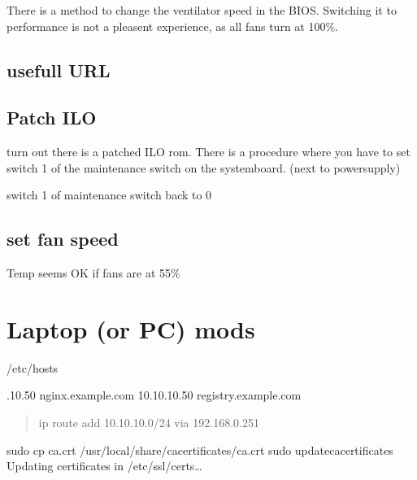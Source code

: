 \documentclass[letterpaper,10pt,english]{sphinxmanual}
\begin{document}
\sphinxAtStartPar
There is a method to change the ventilator speed in the BIOS. Switching it to performance is not a pleasent experience, as all fans turn at 100\%.


\section{usefull URL}
\label{\detokenize{fan:usefull-url}}
\sphinxAtStartPar
{}

\sphinxAtStartPar
{}


\section{Patch ILO}
\label{\detokenize{fan:patch-ilo}}
\sphinxAtStartPar
turn out there is a patched ILO rom. There is a procedure where you have to set switch 1 of the maintenance switch on the systemboard. (next to powersupply)

\sphinxAtStartPar
switch 1 of maintenance switch back to 0


\section{set fan speed}
\label{\detokenize{fan:set-fan-speed}}
\sphinxAtStartPar
Temp seems OK if fans are at 55\%

\sphinxstepscope


\chapter{Laptop (or PC) mods}
\label{\detokenize{laptop:laptop-or-pc-mods}}\label{\detokenize{laptop::doc}}
\sphinxAtStartPar
/etc/hosts

.10.50 nginx.example.com
10.10.10.50 registry.example.com
\begin{quote}

\sphinxAtStartPar
ip route add 10.10.10.0/24 via 192.168.0.251
\end{quote}

\sphinxAtStartPar
sudo cp ca.crt /usr/local/share/ca\sphinxhyphen{}certificates/ca.crt
sudo update\sphinxhyphen{}ca\sphinxhyphen{}certificates
Updating certificates in /etc/ssl/certs…
\end{document}
